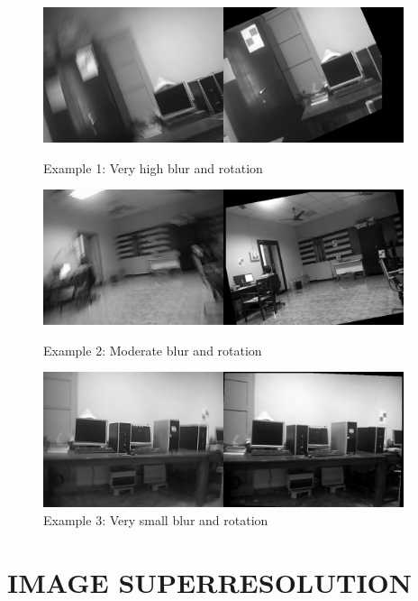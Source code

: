 \documentclass[BTech]{iitmdiss}
\begin{document}
\begin{figure}[h]
\begin{center}
\includegraphics[width=300pt]{images/imreg/rotation/eg1/imreg.png}
\caption{Example 1: Very high blur and rotation}
\includegraphics[width=300pt]{images/imreg/rotation/eg2/imreg.png}
\caption{Example 2: Moderate blur and rotation}
\includegraphics[width=300pt]{images/imreg/rotation/eg3/imreg.png}
\caption{Example 3: Very small blur and rotation}
\end{center}
\end{figure}

\pagebreak
\chapter{IMAGE SUPERRESOLUTION}
\label{chap:image_superresolution}
\pagebreak
\end{document}
